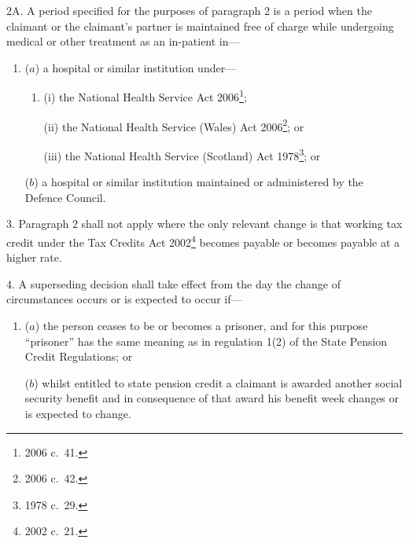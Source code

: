 \documentclass[12pt,a4paper]{article}
\begin{document}

\medskip

2A.  A period specified for the purposes of paragraph 2 is a period when the claimant or the claimant’s partner is maintained free of charge while undergoing medical or other treatment as an in-patient in—
\begin{enumerate}\item[]
($a$) a hospital or similar institution under—
\begin{enumerate}\item[]
(i) the National Health Service Act 2006\footnote{2006 c.~41.};

(ii) the National Health Service (Wales) Act 2006\footnote{2006 c.~42.}; or

(iii) the National Health Service (Scotland) Act 1978\footnote{1978 c.~29.}; or
\end{enumerate}

($b$) a hospital or similar institution maintained or administered by the Defence Council.
\end{enumerate}


\medskip

3.  Paragraph 2 shall not apply where the only relevant change is that working tax credit under the Tax Credits Act 2002\footnote{2002 c.\ 21.} becomes payable or becomes payable at a higher rate.

\medskip

4.  A superseding decision shall take effect from the day the change of circumstances occurs or is expected to occur if—
\begin{enumerate}\item[]
($a$) the person ceases to be or becomes a prisoner, and for this purpose “prisoner” has the same meaning as in regulation 1(2) of the State Pension Credit Regulations; or

($b$) whilst entitled to state pension credit a claimant is awarded another social security benefit and in consequence of that award his benefit week changes or is expected to change.
\end{enumerate}
\end{document}
